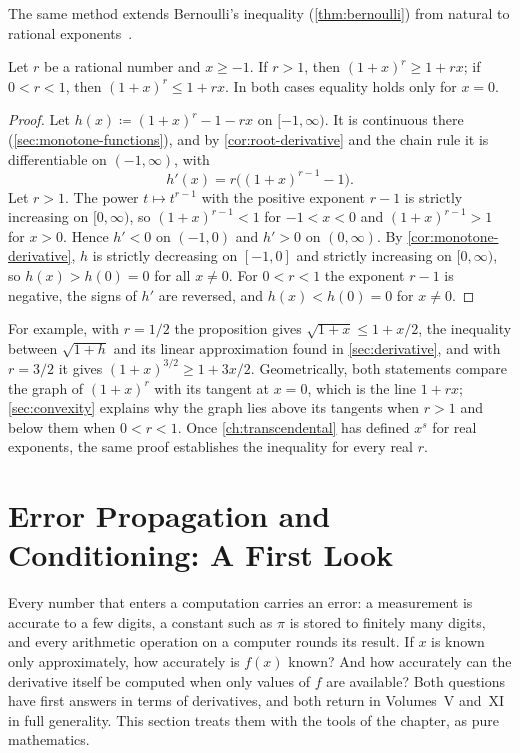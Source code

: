 The same method extends Bernoulli's inequality (\cref{thm:bernoulli}) from natural to rational exponents~\cite{mitrinovic1993bernoulli}.

\begin{proposition}
\label{prop:bernoulli-rational}
Let $r$ be a rational number and $x\ge-1$. If $r>1$, then $(1+x)^r\ge1+rx$; if $0<r<1$, then $(1+x)^r\le1+rx$. In both cases equality holds only for $x=0$.
\end{proposition}

\begin{proof}
Let $h(x)\coloneqq(1+x)^r-1-rx$ on $[-1,\infty)$. It is continuous there (\cref{sec:monotone-functions}), and by \cref{cor:root-derivative} and the chain rule it is differentiable on $(-1,\infty)$, with
\[
h'(x)=r\bigl((1+x)^{r-1}-1\bigr).
\]
Let $r>1$. The power $t\mapsto t^{r-1}$ with the positive exponent $r-1$ is strictly increasing on $[0,\infty)$, so $(1+x)^{r-1}<1$ for $-1<x<0$ and $(1+x)^{r-1}>1$ for $x>0$. Hence $h'<0$ on $(-1,0)$ and $h'>0$ on $(0,\infty)$. By \cref{cor:monotone-derivative}, $h$ is strictly decreasing on $[-1,0]$ and strictly increasing on $[0,\infty)$, so $h(x)>h(0)=0$ for all $x\ne0$. For $0<r<1$ the exponent $r-1$ is negative, the signs of $h'$ are reversed, and $h(x)<h(0)=0$ for $x\ne0$.
\end{proof}

For example, with $r=1/2$ the proposition gives $\sqrt{1+x}\le1+x/2$, the inequality between $\sqrt{1+h}$ and its linear approximation found in \cref{sec:derivative}, and with $r=3/2$ it gives $(1+x)^{3/2}\ge1+3x/2$. Geometrically, both statements compare the graph of $(1+x)^r$ with its tangent at $x=0$, which is the line $1+rx$; \cref{sec:convexity} explains why the graph lies above its tangents when $r>1$ and below them when $0<r<1$. Once \cref{ch:transcendental} has defined $x^s$ for real exponents, the same proof establishes the inequality for every real $r$.

\section{Error Propagation and Conditioning: A First Look}
\label{sec:conditioning}

Every number that enters a computation carries an error: a measurement is accurate to a few digits, a constant such as $\pi$ is stored to finitely many digits, and every arithmetic operation on a computer rounds its result. If $x$ is known only approximately, how accurately is $f(x)$ known? And how accurately can the derivative itself be computed when only values of $f$ are available? Both questions have first answers in terms of derivatives, and both return in Volumes~V and~XI in full generality. This section treats them with the tools of the chapter, as pure mathematics.

